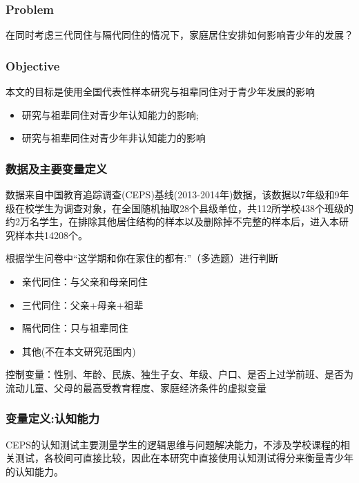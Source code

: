 \documentclass{beamer}
\begin{document}
\begin{frame}
	\frametitle{Problem}
	在同时考虑三代同住与隔代同住的情况下，家庭居住安排如何影响青少年的发展？
\end{frame}

\begin{frame}
	\frametitle{Objective}
本文的目标是使用全国代表性样本研究与祖辈同住对于青少年发展的影响
	\begin{itemize}
		\item 研究与祖辈同住对青少年认知能力的影响;
		\item 研究与祖辈同住对青少年非认知能力的影响
	\end{itemize}
\end{frame}


\begin{frame}
	\frametitle{数据及主要变量定义}
数据来自中国教育追踪调查(CEPS)基线(2013-2014年)数据，该数据以7年级和9年级在校学生为调查对象，在全国随机抽取28个县级单位，共112所学校438个班级的约2万名学生，在排除其他居住结构的样本以及删除掉不完整的样本后，进入本研究样本共14208个。
\par 根据学生问卷中“这学期和你在家住的都有:”（多选题）进行判断
	\begin{itemize}
		\item 亲代同住：与父亲和母亲同住\citep{brown_marriage_2010,liang_2017}
		\item 三代同住：父亲+母亲+祖辈
		\item 隔代同住：只与祖辈同住
		\item 其他(不在本文研究范围内)
	\end{itemize}
\par 控制变量：性别、年龄、民族、独生子女、年级、户口、是否上过学前班、是否为流动儿童、父母的最高受教育程度、家庭经济条件的虚拟变量
\end{frame}



\begin{frame}
	\frametitle{变量定义:认知能力}
CEPS的认知测试主要测量学生的逻辑思维与问题解决能力，不涉及学校课程的相关测试，各校间可直接比较，因此在本研究中直接使用认知测试得分来衡量青少年的认知能力。
\end{frame}
\end{document}
